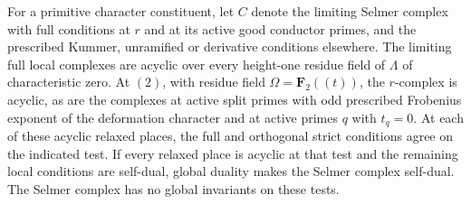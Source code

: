 \begin{lemma}\label{rl:local-acyclic}
\label{lem:h:relaxed-local}
For a primitive character constituent, let $C$ denote the limiting
Selmer complex with full conditions at $r$ and at its active good
conductor primes, and the prescribed Kummer, unramified or derivative
conditions elsewhere.  The limiting full
local complexes are acyclic over every height-one residue field of
$\Lambda$ of characteristic zero.  At $(2)$, with residue field
$\Omega=\mathbf F_2((t))$, the $r$-complex is acyclic, as are the
complexes at active split primes with odd prescribed Frobenius exponent
of the deformation character and
at active primes $q$ with $t_q=0$. At each of these acyclic relaxed
places, the full and orthogonal strict conditions agree on the
indicated test. If every relaxed place is acyclic at that test and
the remaining local conditions are self-dual, global duality makes
the Selmer complex self-dual. The Selmer complex
has no global invariants on these tests.
\end{lemma}

